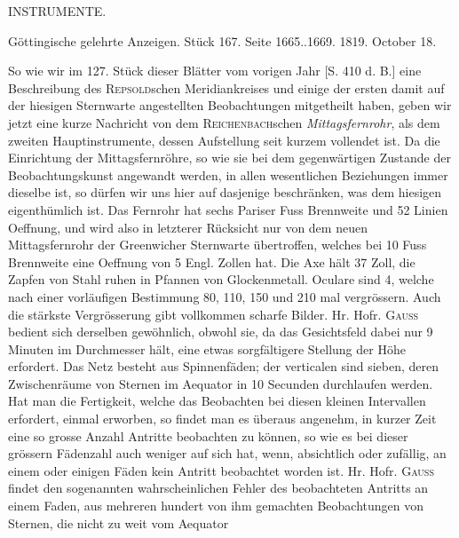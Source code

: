 \clearpage
{}
\hypertarget{native-427-part-lower}{}
\begin{center}
\Large INSTRUMENTE.
\end{center}



\begin{center}
Göttingische gelehrte Anzeigen. Stück 167. Seite 1665..1669. 1819. October 18.
\end{center}





So wie wir im 127. Stück dieser Blätter vom vorigen Jahr [S. 410 d. B.] eine Beschreibung des
\textsc{Repsold}schen Meridiankreises und einige der ersten damit auf der hiesigen Sternwarte angestellten
Beobachtungen mitgetheilt haben, geben wir jetzt eine kurze Nachricht von dem \textsc{Reichenbach}schen
\emph{Mittagsfernrohr}, als dem zweiten Hauptinstrumente, dessen Aufstellung seit kurzem vollendet ist. Da
die Einrichtung der Mittagsfernröhre, so wie sie bei dem gegenwärtigen Zustande der Beobachtungskunst
angewandt werden, in allen wesentlichen Beziehungen immer dieselbe ist, so dürfen wir uns hier auf
dasjenige beschränken, was dem hiesigen eigenthümlich ist. Das Fernrohr hat sechs Pariser
Fuss Brennweite und 52 Linien Oeffnung, und wird also in letzterer Rücksicht nur von dem neuen Mittagsfernrohr
der Greenwicher Sternwarte übertroffen, welches bei 10 Fuss Brennweite eine Oeffnung von
5 Engl. Zollen hat. Die Axe hält 37 Zoll, die Zapfen von Stahl ruhen in Pfannen von Glockenmetall.
Oculare sind 4, welche nach einer vorläufigen Bestimmung 80, 110, 150 und 210 mal vergrössern. Auch
die stärkste Vergrösserung gibt vollkommen scharfe Bilder. Hr. Hofr. \textsc{Gauss} bedient sich derselben gewöhnlich,
obwohl sie, da das Gesichtsfeld dabei nur 9 Minuten im Durchmesser hält, eine etwas sorgfältigere
Stellung der Höhe erfordert. Das Netz besteht aus Spinnenfäden; der verticalen sind sieben,
deren Zwischenräume von Sternen im Aequator in 10 Secunden durchlaufen werden. Hat man die Fertigkeit,
welche das Beobachten bei diesen kleinen Intervallen erfordert, einmal erworben, so findet man
es überaus angenehm, in kurzer Zeit eine so grosse Anzahl Antritte beobachten zu können, so wie es
bei dieser grössern Fädenzahl auch weniger auf sich hat, wenn, absichtlich oder zufällig, an einem
oder einigen Fäden kein Antritt beobachtet worden ist. Hr. Hofr. \textsc{Gauss} findet den sogenannten wahrscheinlichen
Fehler des beobachteten Antritts an einem Faden, aus mehreren hundert von ihm gemachten Beobachtungen von Sternen, die nicht zu weit vom Aequator
